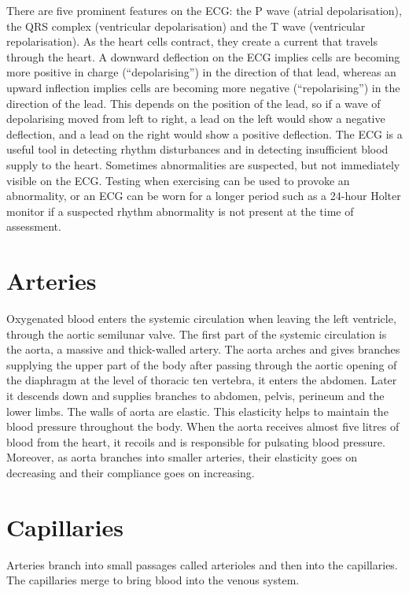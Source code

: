 There are five prominent features on the ECG: the P wave (atrial depolarisation), the QRS complex (ventricular depolarisation) and the T wave (ventricular repolarisation). As the heart cells contract, they create a current that travels through the heart. A downward deflection on the ECG implies cells are becoming more positive in charge (``depolarising'') in the direction of that lead, whereas an upward inflection implies cells are becoming more negative (``repolarising'') in the direction of the lead. This depends on the position of the lead, so if a wave of depolarising moved from left to right, a lead on the left would show a negative deflection, and a lead on the right would show a positive deflection. The ECG is a useful tool in detecting rhythm disturbances and in detecting insufficient blood supply to the heart. Sometimes abnormalities are suspected, but not immediately visible on the ECG. Testing when exercising can be used to provoke an abnormality, or an ECG can be worn for a longer period such as a 24-hour Holter monitor if a suspected rhythm abnormality is not present at the time of assessment.

\hypertarget{arteries}{%
\section{Arteries}\label{arteries}}

Oxygenated blood enters the systemic circulation when leaving the left ventricle, through the aortic semilunar valve. The first part of the systemic circulation is the aorta, a massive and thick-walled artery. The aorta arches and gives branches supplying the upper part of the body after passing through the aortic opening of the diaphragm at the level of thoracic ten vertebra, it enters the abdomen. Later it descends down and supplies branches to abdomen, pelvis, perineum and the lower limbs. The walls of aorta are elastic. This elasticity helps to maintain the blood pressure throughout the body. When the aorta receives almost five litres of blood from the heart, it recoils and is responsible for pulsating blood pressure. Moreover, as aorta branches into smaller arteries, their elasticity goes on decreasing and their compliance goes on increasing.

\hypertarget{capillaries}{%
\section{Capillaries}\label{capillaries}}

Arteries branch into small passages called arterioles and then into the capillaries. The capillaries merge to bring blood into the venous system.

